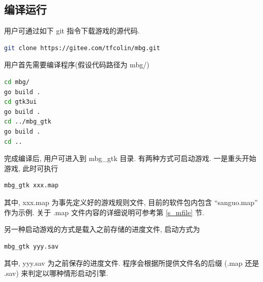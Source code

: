 \documentclass[UTF8, zihao=-4]{ctexart} %
\begin{document}
\subsection{编译运行}
\label{s_compile}
用户可通过如下 git 指令下载游戏的源代码.
\begin{lstlisting}[language=bash]
git clone https://gitee.com/tfcolin/mbg.git
\end{lstlisting}

用户首先需要编译程序(假设代码路径为 mbg/)
\begin{lstlisting}[language=bash]
cd mbg/
go build .
cd gtk3ui
go build .
cd ../mbg_gtk
go build .
cd ..
\end{lstlisting}

完成编译后, 用户可进入到 mbg\_gtk 目录.
有两种方式可启动游戏. 一是重头开始游戏, 此时可执行 
\begin{lstlisting}[language=bash]
mbg_gtk xxx.map
\end{lstlisting}
其中, xxx.map 为事先定义好的游戏规则文件, 目前的软件包内包含 ``sanguo.map'' 作为示例.
关于 .map 文件内容的详细说明可参考第 \ref{s_mfile} 节.

另一种启动游戏的方式是载入之前存储的进度文件, 启动方式为
\begin{lstlisting}[language=bash]
mbg_gtk yyy.sav
\end{lstlisting}
其中, yyy.sav 为之前保存的进度文件.
程序会根据所提供文件名的后缀 (.map 还是 .sav) 来判定以哪种情形启动引擎.
\end{document}
